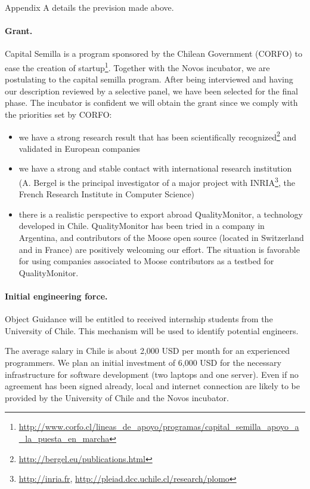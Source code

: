 \documentclass[runningheads]{llncs}
\begin{document}
Appendix A details the prevision made above.

\paragraph{Grant.} Capital Semilla is a program sponsored by the Chilean Government (CORFO) to ease the creation of startup\footnote{\url{http://www.corfo.cl/lineas_de_apoyo/programas/capital_semilla_apoyo_a_la_puesta_en_marcha}}. Together with the Novos incubator, we are postulating to the capital semilla program. After being interviewed and  having our description reviewed by a selective panel, we have been selected for the final phase. The incubator is confident we will obtain the grant since we comply with the priorities set by CORFO: 
\begin{itemize}
\item we have a strong research result that has been scientifically recognized\footnote{\url{http://bergel.eu/publications.html}} and validated in European companies
\item we have a strong and stable contact with international research institution (A. Bergel is the principal investigator of a major project with INRIA\footnote{\url{http://inria.fr}, \url{http://pleiad.dcc.uchile.cl/research/plomo}}, the French Research Institute in Computer Science)
\item there is a realistic perspective to export abroad QualityMonitor, a technology developed in Chile. QualityMonitor has been tried in a company in Argentina, and contributors of the Moose open source (located in Switzerland and in France) are positively welcoming our effort. The situation is favorable for using companies associated to Moose contributors as a testbed for QualityMonitor.
\end{itemize}

\paragraph{Initial engineering force.} Object Guidance will be entitled to received internship students from the University of Chile. This mechanism will be used to identify potential engineers.

The average salary in Chile is about 2,000 USD per month for an experienced programmers. We plan an initial investment of 6,000 USD for the necessary infrastructure for software development (two laptops and one server). Even if no agreement has been signed already, local and internet connection are likely to be provided by the University of Chile and the Novos incubator. 
\end{document}
